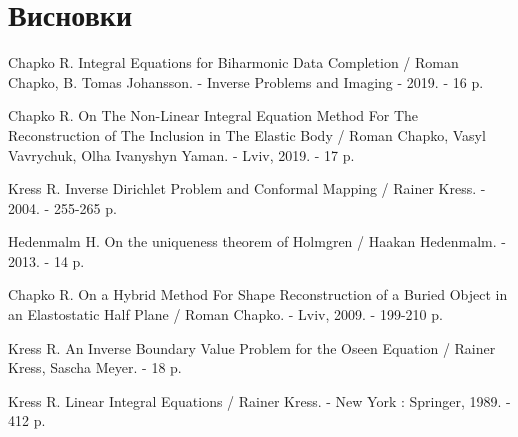 \documentclass[12pt]{report}
\begin{document}
\chapter*{Висновки}

\begin{thebibliography}{99}

Chapko R. Integral Equations for Biharmonic Data Completion / Roman Chapko, B. Tomas Johansson. - Inverse Problems and Imaging - 2019. - 16 p.
 
Chapko R. On The Non-Linear Integral Equation Method For The Reconstruction of The Inclusion in The Elastic Body / Roman Chapko, Vasyl Vavrychuk, Olha Ivanyshyn Yaman. - Lviv, 2019. - 17 p.
 
Kress R. Inverse Dirichlet Problem and Conformal Mapping / Rainer Kress. - 2004. - 255-265 p.
 
Hedenmalm H. On the uniqueness theorem of Holmgren / Haakan Hedenmalm. - 2013. - 14 p.

Chapko R. On a Hybrid Method For Shape Reconstruction of a Buried Object in an Elastostatic Half Plane / Roman Chapko. - Lviv, 2009. - 199-210 p.

Kress R. An Inverse Boundary Value Problem for the Oseen Equation / Rainer Kress, Sascha Meyer. - 18 p.
 
Kress R. Linear Integral Equations / Rainer Kress. - New York : Springer, 1989. - 412 p.

\end{thebibliography}
\end{document}
